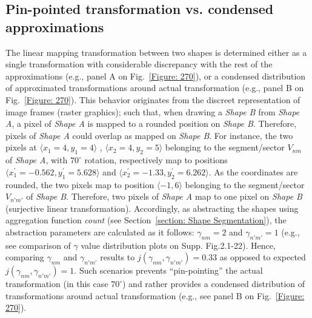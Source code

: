 \subsection{Pin-pointed transformation vs. condensed approximations}
The linear mapping transformation between two shapes is determined either as a single transformation with considerable discrepancy with the rest of the approximations (e.g., panel A on Fig.~\ref{Figure: 270}), or a condensed distribution of approximated transformations around actual transformation (e.g., panel B on Fig.~\ref{Figure: 270}). This behavior originates from the discreet representation of image frames (raster graphics); such that, when drawing a \textit{Shape B} from \textit{Shape A}, a pixel of \textit{Shape A} is mapped to a rounded position on \textit{Shape B}. Therefore, pixels of \textit{Shape A} could overlap as mapped on \textit{Shape B}. For instance, the two pixels at $\langle x_1=4, y_1=4 \rangle$ , $\langle x_2=4, y_2=5 \rangle$ belonging to the segment/sector $V_{nm}$ of \textit{Shape A}, with $70^\circ$ rotation, respectively map to positions $\langle x_1^\prime = -0.562, y_1^\prime = 5.628 \rangle$ and $\langle x_2^\prime = -1.33, y_2^\prime = 6.262 \rangle$. As the coordinates are rounded, the two pixels map to position $\langle -1, 6 \rangle$ belonging to the segment/sector $V_{n'm'}$ of \textit{Shape B}. Therefore, two pixels of \textit{Shape A} map to one pixel on \textit{Shape B} (surjective linear transformation). Accordingly, as abstracting the shapes using aggregation function \textit{count} (see Section~\ref{section: Shape Segmentation}), the abstraction parameters are calculated as it follows: $\gamma_{nm} = 2$ and $\gamma_{n'm'} = 1$ (e.g., see comparison of $\gamma$ value distribution plots on Supp. Fig.2.1-22). Hence, comparing $\gamma_{nm}$ and $\gamma_{n'm'}$ results to $j(\gamma_{nm}, \gamma_{n'm'}) = 0.33$ as opposed to expected $j(\gamma_{nm}, \gamma_{n'm'}) = 1$. Such scenarios prevents ``pin-pointing'' the actual transformation (in this case $70^\circ$) and rather provides a condensed distribution of transformations around actual transformation (e.g., see panel B on Fig.~\ref{Figure: 270}).


